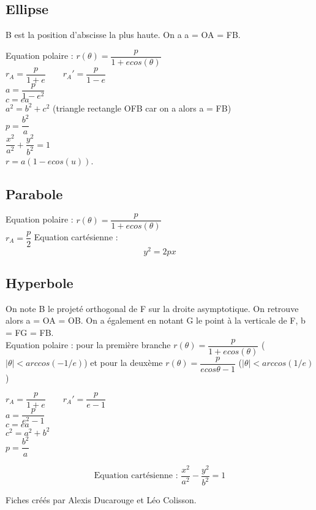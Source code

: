 \documentclass[9pt]{article}
\begin{document}
\begin{multicols*}{2}
\subsection{Ellipse}
B est la position d'abscisse la plus haute. On a a = OA = FB.
\begin{center}
Equation polaire : $r(\theta) = \dfrac{p}{1+e cos(\theta)} $\\
$r_A = \dfrac{p}{1+e} \qquad r_A' = \dfrac{p}{1-e} $\\
$a = \dfrac{p}{1-e^2} $\\
$c=ea$\\
$a^2 = b^2 + c^2$ (triangle rectangle OFB car on a alors a = FB)\\
$p=\dfrac{b^2}{a}$\\
$\dfrac{x^2}{a^2} + \dfrac{y^2}{b^2} = 1$\\
$r=a(1-e cos(u))$.
\end{center}

\subsection{Parabole}
Equation polaire : $r(\theta) = \dfrac{p}{1+e cos(\theta)} $\\
$r_A = \dfrac{p}{2} $
Equation cartésienne :
$$y^2 = 2px$$
\subsection{Hyperbole}
On note B le projeté orthogonal de F sur la droite asymptotique. On retrouve alors a = OA = OB. On a également en notant G le point à la verticale de F, b = FG = FB.\\

Equation polaire : pour la première branche $r(\theta) = \dfrac{p}{1+e cos(\theta)} $ ($|\theta| < arccos(-1/e)$) et pour la deuxème $r(\theta) = \dfrac{p}{e cos\theta - 1} $ ($|\theta| < arccos(1/e)$)
\begin{center}
$r_A = \dfrac{p}{1+e} \qquad r_A' = \dfrac{p}{e-1} $\\
$a = \dfrac{p}{e^2 - 1}$\\
$c=ea$\\
$c^2 = a^2 + b^2$\\
$p = \dfrac{b^2}{a} $
\end{center}
$$\text{Equation cartésienne : } \dfrac{x^2}{a^2} - \dfrac{y^2}{b^2} = 1$$

\vfill\null
\footnotesize{Fiches créés par Alexis Ducarouge et Léo Colisson.}

\end{multicols*}
\end{document}
